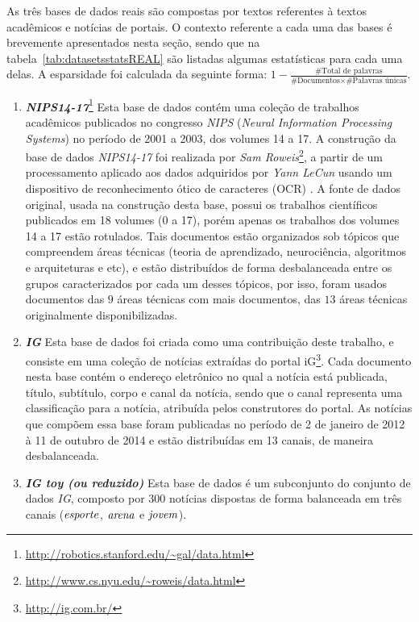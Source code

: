\documentclass[
    12pt,                %
    oneside,            %
    a4paper,            %
    english,            %
    brazil                %
    ]{abntex2ppgsi}
\begin{document}
As três bases de dados reais são compostas por textos referentes à textos acadêmicos e notícias de portais.
O contexto referente a cada uma das bases é brevemente apresentados nesta seção, sendo que na tabela~\ref{tab:datasetsstatsREAL} são listadas algumas estatísticas para cada uma delas.
A esparsidade foi calculada da seguinte forma: $1 - \frac{ \text{\# Total de palavras} }{ \text{\# Documentos} \times \text{\# Palavras únicas} }$.

\begin{enumerate}
    \item \textbf{\textit{NIPS14-17}}\footnote{\url{http://robotics.stanford.edu/~gal/data.html}} Esta base de dados contém uma coleção de trabalhos acadêmicos publicados no congresso \textit{NIPS} (\textit{Neural Information Processing Systems}) no período de 2001 a 2003, dos volumes 14 a 17.
    A construção da base de dados \textit{NIPS14-17} foi realizada por \textit{Sam Roweis}\footnote{\url{http://www.cs.nyu.edu/~roweis/data.html}}, a partir de um processamento aplicado aos dados adquiridos por \textit{Yann LeCun} usando um dispositivo de reconhecimento ótico de caracteres (OCR) \cite{Chechik2007}. A fonte de dados original, usada na construção desta base, possui os trabalhos científicos publicados em 18 volumes (0 a 17), porém apenas os trabalhos dos volumes 14 a 17 estão rotulados. Tais documentos estão organizados sob tópicos que compreendem áreas técnicas (teoria de aprendizado, neurociência, algoritmos e arquiteturas e etc), e estão distribuídos de forma desbalanceada entre os grupos caracterizados por cada um desses tópicos, por isso, foram usados documentos das $9$ áreas técnicas com mais documentos, das $13$ áreas técnicas originalmente disponibilizadas.
    \item \textbf{\textit{IG}} Esta base de dados foi criada como uma contribuição deste trabalho, e consiste em uma coleção de notícias extraídas do portal iG\footnote{\url{http://ig.com.br/}}.
    Cada documento nesta base contém o endereço eletrônico no qual a notícia está publicada, título, subtítulo, corpo e canal da notícia, sendo que o canal representa uma classificação para a notícia, atribuída pelos construtores do portal. As notícias que compõem essa base foram publicadas no período de 2 de janeiro de 2012 à 11 de outubro de 2014 e estão distribuídas em 13 canais, de maneira desbalanceada.
    \item \textbf{\textit{IG toy (ou reduzido)}} Esta base de dados é um subconjunto do conjunto de dados \textit{IG}, composto por $300$ notícias dispostas de forma balanceada em três canais ($\text{\textit{esporte}}$, $\text{\textit{arena}}$ e $\text{\textit{jovem}}$).
\end{enumerate}
\end{document}
